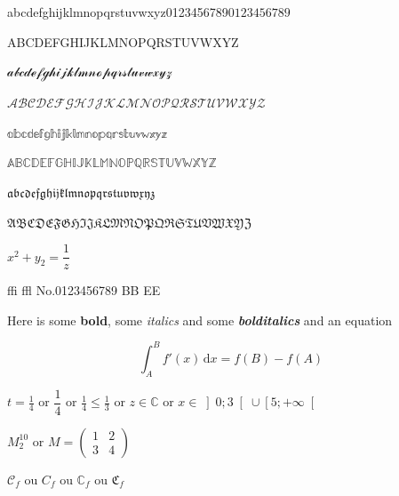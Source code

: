 \documentclass[12pt]{article}
\begin{document}
abcdefghijklmnopqrstuvwxyz0123456789$0123456789$

ABCDEFGHIJKLMNOPQRSTUVWXYZ

$\mathcal{abcdefghijklmnopqrstuvwxyz}$

$\mathcal{ABCDEFGHIJKLMNOPQRSTUVWXYZ}$

$\mathbb{abcdefghijklmnopqrstuvwxyz}$

$\mathbb{ABCDEFGHIJKLMNOPQRSTUVWXYZ}$

$\mathfrak{abcdefghijklmnopqrstuvwxyz}$

$\mathfrak{ABCDEFGHIJKLMNOPQRSTUVWXYZ}$

$x^{2}+y_{2}=\dfrac{1}{z}$

ffi ffl No.0123456789 BB EE

Here is some {\bfseries bold}, some {\itshape italics} and some {\bfseries\itshape bolditalics} and an equation

\[ \int_A^B f'(x)\,\text{d}x = f(B) - f(A) \]

$t = \frac{1}{4}$ or $\dfrac{1}{4}$ or $\tfrac{1}{4} \leq \tfrac{1}{3}$ or $z \in \mathbb{C}$ or $ x \in \left]0;3\right[ \cup \left[5;+\infty\right[$

$M_{2}^{10}$ or $M = \begin{pmatrix} 1&2\\3&4 \end{pmatrix}$


$\mathcal{C}_f$ ou $C_f$ ou $\mathbb{C}_{f}$ ou $\mathfrak{C}_f$
\end{document}
